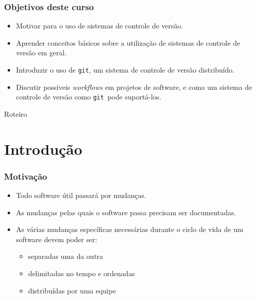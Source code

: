 \documentclass{beamer}
\newcommand{\git}{\texttt{git}}
\begin{document}
\begin{frame}
  \frametitle{Objetivos deste curso}
  \begin{itemize}
    \item Motivar para o uso de sistemas de controle de versão.
    \item Aprender conceitos básicos sobre a utilização de sistemas de
      controle de versão em geral.
    \item Introduzir o uso de \git, um sistema de controle de versão
      distribuído.
    \item Discutir possíveis \emph{workflows} em projetos de software, e
      como um sistema de controle de versão como \git\ pode suportá-los.
  \end{itemize}
\end{frame}

\begin{frame}{Roteiro}
  \tableofcontents[hideallsubsections]
\end{frame}

\section{Introdução}

\begin{frame}
  \frametitle{Motivação}
  \begin{itemize}
      \pause
    \item Todo software útil passará por mudanças.
      \pause
    \item As mudanças pelas quais o software passa precisam ser
      documentadas.
      \pause
    \item As várias mudanças específicas necessárias durante o ciclo de
      vida de um software devem poder ser:
      \pause
      \begin{itemize}
        \item separadas uma da outra
          \pause
        \item delimitadas no tempo e ordenadas
          \pause
        \item distribuídas por uma equipe
      \end{itemize}
  \end{itemize}
\end{frame}
\end{document}
